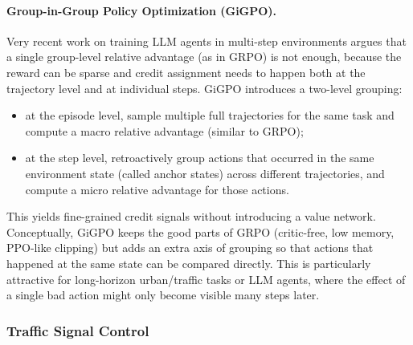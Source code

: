 \paragraph{Group-in-Group Policy Optimization (GiGPO).}
Very recent work on training LLM agents in multi-step environments argues that a single group-level relative advantage (as in GRPO) is not enough, because the reward can be sparse and credit assignment needs to happen both at the trajectory level and at individual steps. GiGPO \cite{feng2025groupingrouppolicyoptimizationllm} introduces a two-level grouping:
\begin{itemize}
  \item at the episode level, sample multiple full trajectories for the same task and compute a macro relative advantage (similar to GRPO);
  \item at the step level, retroactively group actions that occurred in the same environment state (called anchor states) across different trajectories, and compute a micro relative advantage for those actions.
\end{itemize}
This yields fine-grained credit signals without introducing a value network. Conceptually, GiGPO keeps the good parts of GRPO (critic-free, low memory, PPO-like clipping) but adds an extra axis of grouping so that actions that happened at the same state can be compared directly. This is particularly attractive for long-horizon urban/traffic tasks or LLM agents, where the effect of a single bad action might only become visible many steps later.

\subsubsection{Traffic Signal Control}

